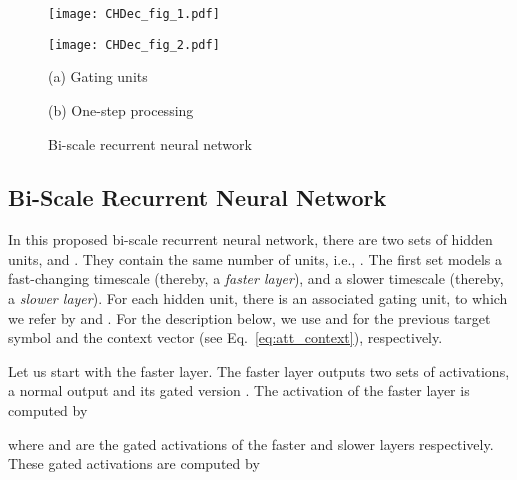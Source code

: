 \documentclass[11pt]{article}
\begin{document}
\begin{figure}
    \begin{minipage}{1.\columnwidth}
        \begin{minipage}{0.46\columnwidth}
            \centering
            \texttt{[image: CHDec\_fig\_1.pdf]}
        \end{minipage}
        \hfill
        \begin{minipage}{0.46\columnwidth}
            \centering
            \texttt{[image: CHDec\_fig\_2.pdf]}
        \end{minipage}
    \end{minipage}
    \begin{minipage}{1.\columnwidth}
        \begin{minipage}{0.48\columnwidth}
            \centering
            (a) Gating units
        \end{minipage}
        \begin{minipage}{0.48\columnwidth}
            \centering
            (b) One-step processing
        \end{minipage}
    \end{minipage}

   
    \caption{Bi-scale recurrent neural network}
    \label{fig:CHDec}

\end{figure}

\subsection{Bi-Scale Recurrent Neural Network}

In this proposed bi-scale recurrent neural network, there are two sets of hidden
units,  and . They contain the same number of units, i.e.,
. The first set  models a
fast-changing timescale (thereby, a {\em faster layer}), and  a slower
timescale (thereby, a {\em slower layer}). For each hidden unit, there is an
associated gating unit, to which we refer by  and . For the
description below, we use  and  for the previous target symbol
and the context vector (see Eq.~\eqref{eq:att_context}), respectively.

Let us start with the faster layer. The faster layer outputs two sets of
activations, a normal output  and its gated version
. The activation of the faster layer is computed by

where  and  are the gated activations
of the faster and slower layers respectively.  These gated activations are
computed by
\end{document}

